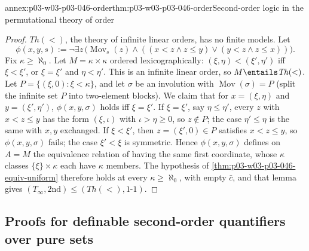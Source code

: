 \begin{annexitem}{annex:p03-w03-p03-046-order}{thm:p03-w03-p03-046-order}{Second-order logic in the permutational theory of order}
\begin{proof}
\(\mathit{Th}(<)\), the theory of infinite linear orders, has no finite
models. Let
\[
\phi(x,y,s):=\neg\exists z\,\bigl(\operatorname{Mov}_s(z)\wedge((x<z\wedge z\le y)\vee(y<z\wedge z\le x))\bigr).
\]
Fix \(\kappa\ge\aleph_0\). Let \(M=\kappa\times\kappa\) ordered
lexicographically: \((\xi,\eta)<(\xi',\eta')\) iff \(\xi<\xi'\), or
\(\xi=\xi'\) and \(\eta<\eta'\). This is an infinite linear order, so
\(M\entails\mathit{Th}(<)\). Let \(P=\{(\xi,0):\xi<\kappa\}\), and let
\(\sigma\) be an involution with \(\operatorname{Mov}(\sigma)=P\) (split the
infinite set \(P\) into two-element blocks). We claim that for
\(x=(\xi,\eta)\) and \(y=(\xi',\eta')\), \(\phi(x,y,\sigma)\) holds iff
\(\xi=\xi'\). If \(\xi=\xi'\), say \(\eta\le\eta'\), every \(z\) with
\(x<z\le y\) has the form \((\xi,\iota)\) with \(\iota>\eta\ge 0\), so
\(z\notin P\); the case \(\eta'\le\eta\) is the same with \(x,y\)
exchanged. If \(\xi<\xi'\), then \(z=(\xi',0)\in P\) satisfies
\(x<z\le y\), so \(\phi(x,y,\sigma)\) fails; the case \(\xi'<\xi\) is
symmetric. Hence \(\phi(x,y,\sigma)\) defines on \(A=M\) the equivalence
relation of having the same first coordinate, whose \(\kappa\) classes
\(\{\xi\}\times\kappa\) each have \(\kappa\) members. The hypothesis of
\cref{thm:p03-w03-p03-046-equiv-uniform} therefore holds at every
\(\kappa\ge\aleph_0\), with empty \(\bar c\), and that lemma gives
\((T_\infty,\mathrm{2nd})\le(\mathit{Th}(<),\text{1-1})\).
\end{proof}
\end{annexitem}

\subsection*{Proofs for definable second-order quantifiers over pure sets}

